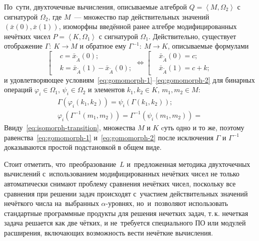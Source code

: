 По~сути, двухточечные вычисления, описываемые алгеброй $Q=\left\langle M, \Omega_2 \right\rangle$ с сигнатурой $\Omega_2$, где $M$~--- множество пар действительных значений $\left(\bar x\left(0\right), \bar x \left(1\right) \right)$, изоморфны введённой ранее алгебре модифицированных нечётких чисел $P=\left\langle K, \Omega_1 \right\rangle$ с сигнатурой $\Omega_1$. Действительно, существует отображение $\Gamma:\ K \to M$ и обратное ему $\Gamma^{-1}:\ M \to K$, описываемые формулами 
\begin{equation}
  \label{eq:isomorph-transition}
  \left[ \begin{aligned}
    & c=\bar{x}_{\tilde A}\left( 0 \right); \\ 
    & k=\bar{x}_{\tilde A}\left( 1 \right)-\bar{x}_{\tilde A}\left( 0 \right);
  \end{aligned} \right.
  \Leftrightarrow 
  \left[ \begin{aligned}
    & \bar{x}_{\tilde A}\left( 0 \right)=c; \\ 
    & \bar{x}_{\tilde A}\left( 1 \right)=c+k;
  \end{aligned} \right.
\end{equation}
и удовлетворяющее условиям~\eqref{eq:gomomorph-1}--\eqref{eq:gomomorph-2} для бинарных операций $\varphi_i \in \Omega_1$, $\psi_i \in \Omega_2$ и элементов $k_1, k_2 \in K$, $m_1, m_2 \in M$:
\begin{gather}
  \label{eq:gomomorph-1}
  \Gamma\left( \varphi_i \left( k_1, k_2 \right) \right) = \psi_i\left( \Gamma \left(k_1, k_2 \right) \right); \\
  \label{eq:gomomorph-2}
  \varphi_i\left( \Gamma^{-1} \left(m_1, m_2 \right) \right) = \Gamma^{-1}\left( \psi_i \left(m_1, m_2 \right) \right) = 
\end{gather}
Ввиду~\eqref{eq:isomorph-transition}, множества $M$ и $K$ cуть одно и то же, поэтому равенства~\eqref{eq:gomomorph-1} и~\eqref{eq:gomomorph-2} после исключения $\Gamma$ и $\Gamma^{-1}$ доказываются простой подстановкой в общем виде. 

Стоит отметить, что~преобразование~$L$ и~предложенная методика двухточечных вычислений с~использованием модифицированных нечётких чисел не только автоматически снимают проблему сравнения нечётких чисел, поскольку все сравнения при решении задач происходят с~участием действительных значений нечёткого числа на~выбранных $\alpha$-уровнях, но~и~позволяют использовать стандартные программные продукты для решения нечетких задач, т.\,к. нечеткая задача решается как две чётких, и не~требуется специального ПО или модулей расширения, включающих возможность вести нечёткие вычисления.

